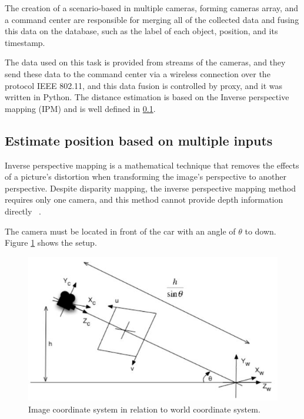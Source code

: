  The creation of a scenario-based in multiple cameras, forming cameras array, and a command center are responsible for merging all of the collected data and fusing this data on the database, such as the label of each object, position, and its timestamp. 

The data used on this task is provided from streams of the cameras, and they send these data to the command center via a wireless connection over the protocol IEEE 802.11, and this data fusion is controlled by proxy, and it was written in Python. The distance estimation is based on the Inverse perspective mapping (IPM) and is well defined in \ref{ipm}.


\subsection{Estimate position based on multiple inputs}\label{ipm}
Inverse perspective mapping is a mathematical technique that removes the effects of a picture's distortion when transforming the image's perspective to another perspective. Despite disparity mapping, the inverse perspective mapping method requires only one camera, and this method cannot provide depth information directly ~\cite{Tuohy2010}.

The camera must be located in front of the car with an angle of \(\theta\) to down. Figure \ref{fig:ImageRelationSystem} shows the setup.

\begin{figure}[h]
\centering
\includegraphics[scale=0.5]{imagens/Inverse Perspective Mapping.JPG}
\caption{Image coordinate system in relation to world coordinate
system.}
\label{fig:ImageRelationSystem}
\end{figure}
\par


